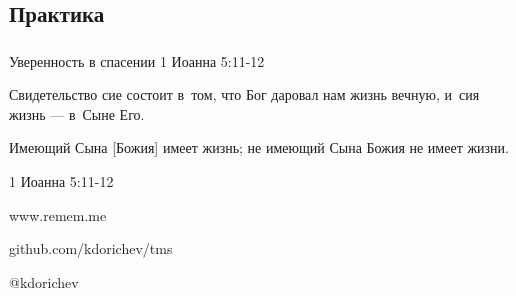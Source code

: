 \documentclass[t,aspectratio=169]{beamer} %
\begin{document}
\subsection{Практика}
\begin{frame}[c]
	\frametitle{\insertsection}
	\framesubtitle{\insertsubsection}
	\begin{center}

  \begin{block}{Уверенность в спасении}
	1 Иоанна 5:11-12	 
	 \vspace{6pt}

	 Свидетельство сие состоит в~том, \newline
	 что Бог даровал нам жизнь вечную, \newline
	 и~сия жизнь — в~Сыне Его. %
	 \vspace{5pt}

	 Имеющий\hspace{1cm} Сына [Божия] \hspace{0.9cm} имеет жизнь; \newline
	 не имеющий\hspace{0.5cm} Сына Божия \hspace{0.5cm} не имеет жизни.
	 \begin{flushright}
		1 Иоанна 5:11-12
	\end{flushright}
\end{block}
\end{center}
\end{frame}
\begin{frame}[c]
\begin{center}
	\LARGE www.remem.me

	\LARGE github.com/kdorichev/tms	

	\LARGE @kdorichev
\end{center}
\end{frame}
\end{document}
